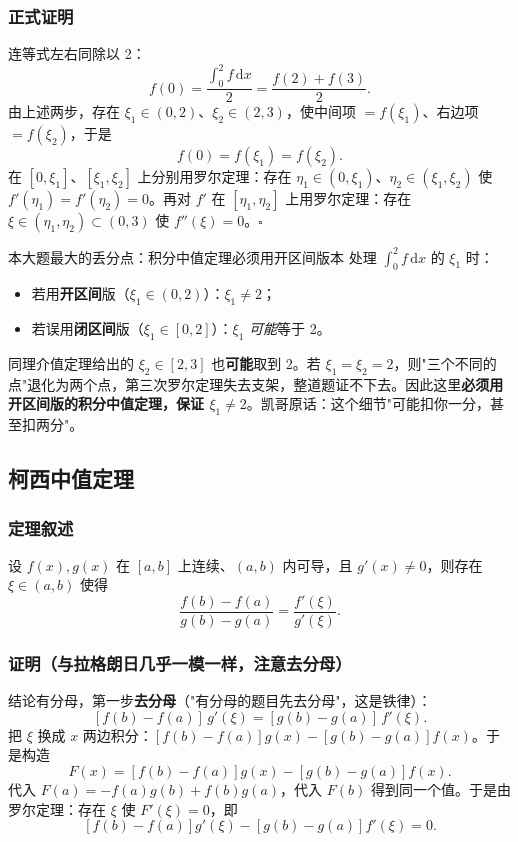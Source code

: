 \documentclass[a4paper]{article}
\begin{document}
\subsubsection{正式证明}

连等式左右同除以 2：
\[
f(0)=\frac{\int_0^2 f\,\mathrm{d}x}{2}=\frac{f(2)+f(3)}{2}.
\]
由上述两步，存在 $\xi_1\in(0,2)$、$\xi_2\in(2,3)$，使中间项 $=f(\xi_1)$、右边项 $=f(\xi_2)$，于是
\[
f(0)=f(\xi_1)=f(\xi_2).
\]
在 $[0,\xi_1]$、$[\xi_1,\xi_2]$ 上分别用罗尔定理：存在 $\eta_1\in(0,\xi_1)$、$\eta_2\in(\xi_1,\xi_2)$ 使 $f'(\eta_1)=f'(\eta_2)=0$。再对 $f'$ 在 $[\eta_1,\eta_2]$ 上用罗尔定理：存在 $\xi\in(\eta_1,\eta_2)\subset(0,3)$ 使 $f''(\xi)=0$。$\square$

\begin{warningbox}{本大题最大的丢分点：积分中值定理必须用开区间版本}
处理 $\int_0^2 f\,\mathrm{d}x$ 的 $\xi_1$ 时：
\begin{itemize}
\item 若用\textbf{开区间}版（$\xi_1\in(0,2)$）：$\xi_1\neq 2$；
\item 若误用\textbf{闭区间}版（$\xi_1\in[0,2]$）：$\xi_1$ \emph{可能}等于 2。
\end{itemize}
同理介值定理给出的 $\xi_2\in[2,3]$ 也\textbf{可能}取到 2。若 $\xi_1=\xi_2=2$，则"三个不同的点"退化为两个点，第三次罗尔定理失去支架，整道题证不下去。因此这里\textbf{必须用开区间版的积分中值定理，保证 $\xi_1\neq 2$}。凯哥原话：这个细节"可能扣你一分，甚至扣两分"。
\end{warningbox}

\subsection{柯西中值定理}

\subsubsection{定理叙述}

设 $f(x),g(x)$ 在 $[a,b]$ 上连续、$(a,b)$ 内可导，且 $g'(x)\neq 0$，则存在 $\xi\in(a,b)$ 使得
\[
\frac{f(b)-f(a)}{g(b)-g(a)}=\frac{f'(\xi)}{g'(\xi)}.
\]

\subsubsection{证明（与拉格朗日几乎一模一样，注意去分母）}

结论有分母，第一步\textbf{去分母}（"有分母的题目先去分母"，这是铁律）：
\[
[f(b)-f(a)]\,g'(\xi)=[g(b)-g(a)]\,f'(\xi).
\]
把 $\xi$ 换成 $x$ 两边积分：$[f(b)-f(a)]g(x)-[g(b)-g(a)]f(x)$。于是构造
\[
F(x)=[f(b)-f(a)]g(x)-[g(b)-g(a)]f(x).
\]
代入 $F(a)=-f(a)g(b)+f(b)g(a)$，代入 $F(b)$ 得到同一个值。于是由罗尔定理：存在 $\xi$ 使 $F'(\xi)=0$，即
\[
[f(b)-f(a)]g'(\xi)-[g(b)-g(a)]f'(\xi)=0.
\]
\end{document}
